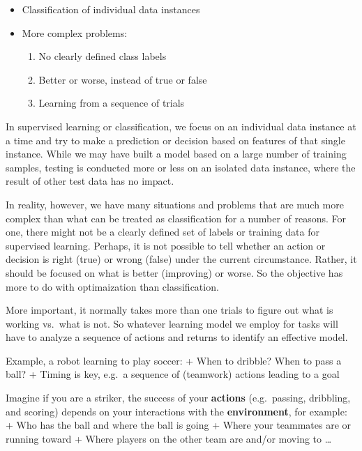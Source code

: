 \documentclass[
  letterpaper,
]{scrbook}
\providecommand{\tightlist}{%
  \setlength{\itemsep}{0pt}\setlength{\parskip}{0pt}}
\begin{document}

\begin{itemize}
\tightlist
\item
  Classification of individual data instances
\item
  More complex problems:

  \begin{enumerate}
  \def\labelenumi{\arabic{enumi}.}
  \tightlist
  \item
    No clearly defined class labels
  \item
    Better or worse, instead of true or false
  \item
    Learning from a sequence of trials
  \end{enumerate}
\end{itemize}

In supervised learning or classification, we focus on an individual data
instance at a time and try to make a prediction or decision based on
features of that single instance. While we may have built a model based
on a large number of training samples, testing is conducted more or less
on an isolated data instance, where the result of other test data has no
impact.

In reality, however, we have many situations and problems that are much
more complex than what can be treated as classification for a number of
reasons. For one, there might not be a clearly defined set of labels or
training data for supervised learning. Perhaps, it is not possible to
tell whether an action or decision is right (true) or wrong (false)
under the current circumstance. Rather, it should be focused on what is
better (improving) or worse. So the objective has more to do with
optimaization than classification.

More important, it normally takes more than one trials to figure out
what is working vs.~what is not. So whatever learning model we employ
for tasks will have to analyze a sequence of actions and returns to
identify an effective model.

Example, a robot learning to play soccer: + When to dribble? When to
pass a ball? + Timing is key, e.g.~a sequence of (teamwork) actions
leading to a goal

Imagine if you are a striker, the success of your \textbf{actions}
(e.g.~passing, dribbling, and scoring) depends on your interactions with
the \textbf{environment}, for example: + Who has the ball and where the
ball is going + Where your teammates are or running toward + Where
players on the other team are and/or moving to \ldots{}
\end{document}
